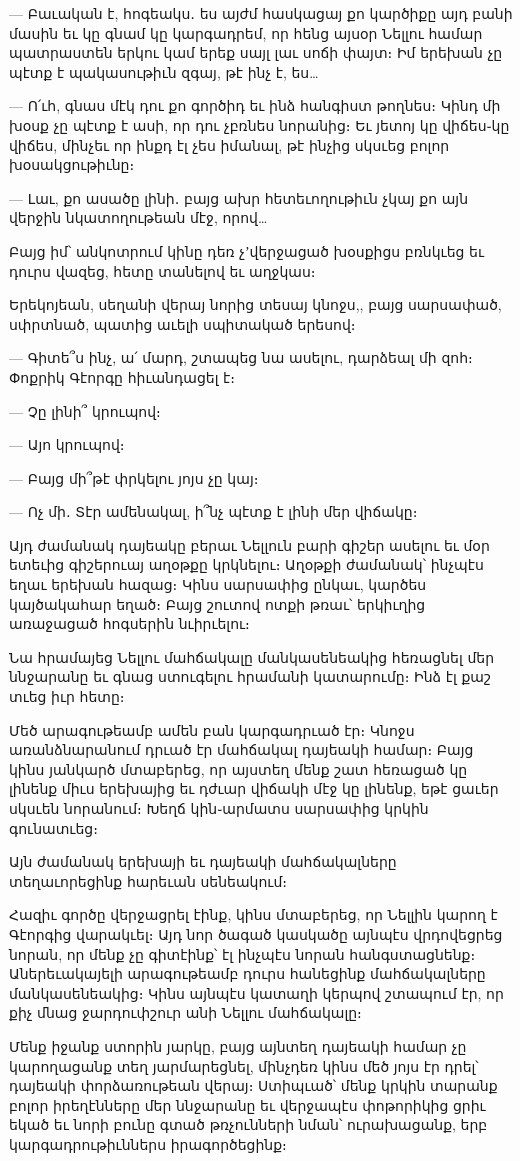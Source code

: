 — Բաւական է, հոգեակս․ ես այժմ հասկացայ քո կարծիքը այդ բանի մասին եւ կը գնամ կը կարգադրեմ, որ հենց այսօր Նելլու համար պատրաստեն երկու կամ երեք սայլ լաւ սոճի փայտ։ Իմ երեխան չը պէտք է պակասութիւն զգայ, թէ ինչ է, ես…

— Ո՛ւհ, գնաս մէկ դու քո գործիդ եւ ինձ հանգիստ թողնես։ Կինդ մի խօսք չը պէտք է ասի, որ դու չբռնես նորանից։ Եւ յետոյ կը վիճես֊կը վիճես, մինչեւ որ ինքդ էլ չես իմանալ, թէ ինչից սկսւեց բոլոր խօսակցութիւնը։

— Լաւ, քո ասածը լինի․ բայց ախր հետեւողութիւն չկայ քո այն վերջին նկատողութեան մէջ, որով…

Բայց իմ՝ անկոտրում կինը դեռ չʼվերջացած խօսքիցս բռնկւեց եւ դուրս վազեց, հետը տանելով եւ աղջկաս։

Երեկոյեան, սեղանի վերայ նորից տեսայ կնոջս,, բայց սարսափած, սփրտնած, պատից աւելի սպիտակած երեսով։

— Գիտե՞ս ինչ, ա՛ մարդ, շտապեց նա ասելու, դարձեալ մի զոհ։ Փոքրիկ Գէորգը հիւանդացել է։

— Չը լինի՞ կրուպով։

— Այո կրուպով։

— Բայց մի՞թէ փրկելու յոյս չը կայ։

— Ոչ մի․ Տէր ամենակալ, ի՞նչ պէտք է լինի մեր վիճակը։

Այդ ժամանակ դայեակը բերաւ Նելլուն բարի գիշեր ասելու եւ մօր ետեւից գիշերուայ աղօթքը կրկնելու։ Աղօթքի ժամանակ՝ ինչպէս եղաւ երեխան հազաց։ Կինս սարսափից ընկաւ, կարծես կայծակահար եղած։ Բայց շուտով ոտքի թռաւ՝ երկիւղից առաջացած հոգսերին նւիրւելու։

Նա հրամայեց Նելլու մահճակալը մանկասենեակից հեռացնել մեր ննջարանը եւ գնաց ստուգելու հրամանի կատարումը։ Ինձ էլ քաշ տւեց իւր հետը։

Մեծ արագութեամբ ամեն բան կարգադրւած էր։ Կնոջս առանձնարանում դրւած էր մահճակալ դայեակի համար։ Բայց կինս յանկարծ մտաբերեց, որ այստեղ մենք շատ հեռացած կը լինենք միւս երեխայից եւ դժւար վիճակի մէջ կը լինենք, եթէ ցաւեր սկսւեն նորանում։ Խեղճ կին֊արմատս սարսափից կրկին գունատւեց։

Այն ժամանակ երեխայի եւ դայեակի մահճակալները տեղաւորեցինք հարեւան սենեակում։

Հազիւ գործը վերջացրել էինք, կինս մտաբերեց, որ Նելլին կարող է Գէորգից վարակւել։ Այդ նոր ծագած կասկածը այնպէս վրդովեցրեց նորան, որ մենք չը գիտէինք՝ էլ ինչպէս նորան հանգստացնենք։ Աներեւակայելի արագութեամբ դուրս հանեցինք մահճակալները մանկասենեակից։ Կինս այնպէս կատաղի կերպով շտապում էր, որ քիչ մնաց ջարդուփշուր անի Նելլու մահճակալը։

Մենք իջանք ստորին յարկը, բայց այնտեղ դայեակի համար չը կարողացանք տեղ յարմարեցնել, մինչդեռ կինս մեծ յոյս էր դրել՝ դայեակի փորձառութեան վերայ։ Ստիպւած՝ մենք կրկին տարանք բոլոր իրեղէնները մեր ննջարանը եւ վերջապէս փոթորիկից ցրիւ եկած եւ նորի բունը գտած թռչունների նման՝ ուրախացանք, երբ կարգադրութիւններս իրագործեցինք։

